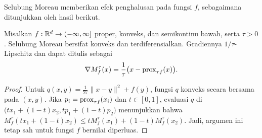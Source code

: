 Selubung Moreau memberikan efek penghalusan pada fungsi \(f\), sebagaimana ditunjukkan oleh hasil berikut.
\begin{lemma}
    Misalkan \(f:\mathbb{R}^d\rightarrow(-\infty,\infty]\) proper, konveks, dan semikontinu bawah, serta \(\tau>0\). Selubung Moreau bersifat konveks dan terdiferensialkan. Gradiennya \(1/\tau\)-Lipschitz dan dapat ditulis sebagai
    \begin{equation}
        \nabla M_f^\tau(x)=\frac{1}{\tau}\bigl(x-\mathrm{prox}_{\tau f}(x)\bigr).
    \end{equation}
\end{lemma}
\begin{proof}
    Untuk \(q(x,y)=\frac{1}{2\tau}\|x-y\|^2+f(y)\), fungsi \(q\) konveks secara bersama pada \((x,y)\). Jika \(p_i=\mathrm{prox}_{\tau f}(x_i)\) dan \(t\in[0,1]\), evaluasi \(q\) di \(\bigl(tx_1+(1-t)x_2,tp_1+(1-t)p_2\bigr)\) menunjukkan bahwa \(M_f^\tau(tx_1+(1-t)x_2)\leq tM_f^\tau(x_1)+(1-t)M_f^\tau(x_2)\). Jadi, argumen ini tetap sah untuk fungsi \(f\) bernilai diperluas.


\end{proof}
